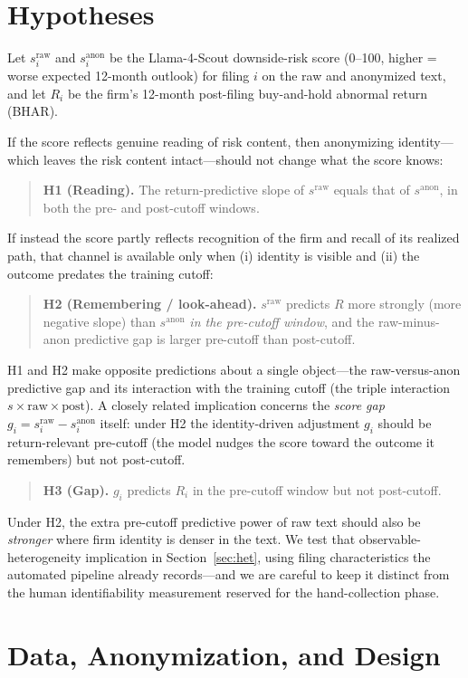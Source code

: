 \documentclass[12pt]{article}
\begin{document}
\section{Hypotheses}\label{sec:hyp}
Let $s^{\text{raw}}_i$ and $s^{\text{anon}}_i$ be the Llama-4-Scout downside-risk score
(0--100, higher = worse expected 12-month outlook) for filing $i$ on the raw and anonymized
text, and let $R_i$ be the firm's 12-month post-filing buy-and-hold abnormal return (BHAR).

If the score reflects genuine reading of risk content, then anonymizing identity---which
leaves the risk content intact---should not change what the score knows:
\begin{quote}
\textbf{H1 (Reading).} The return-predictive slope of $s^{\text{raw}}$ equals that of
$s^{\text{anon}}$, in both the pre- and post-cutoff windows.
\end{quote}
If instead the score partly reflects recognition of the firm and recall of its realized
path, that channel is available only when (i) identity is visible and (ii) the outcome
predates the training cutoff:
\begin{quote}
\textbf{H2 (Remembering / look-ahead).} $s^{\text{raw}}$ predicts $R$ more strongly
(more negative slope) than $s^{\text{anon}}$ \emph{in the pre-cutoff window}, and the
raw-minus-anon predictive gap is larger pre-cutoff than post-cutoff.
\end{quote}
H1 and H2 make opposite predictions about a single object---the raw-versus-anon predictive
gap and its interaction with the training cutoff (the triple interaction
$s\times\text{raw}\times\text{post}$). A closely related implication concerns the
\emph{score gap} $g_i=s^{\text{raw}}_i-s^{\text{anon}}_i$ itself: under H2 the
identity-driven adjustment $g_i$ should be return-relevant pre-cutoff (the model nudges the
score toward the outcome it remembers) but not post-cutoff.
\begin{quote}
\textbf{H3 (Gap).} $g_i$ predicts $R_i$ in the pre-cutoff window but not post-cutoff.
\end{quote}
Under H2, the extra pre-cutoff predictive power of raw text should also be \emph{stronger}
where firm identity is denser in the text. We test that observable-heterogeneity implication
in Section~\ref{sec:het}, using filing characteristics the automated pipeline already
records---and we are careful to keep it distinct from the human identifiability measurement
reserved for the hand-collection phase.

\section{Data, Anonymization, and Design}\label{sec:data}
\end{document}
